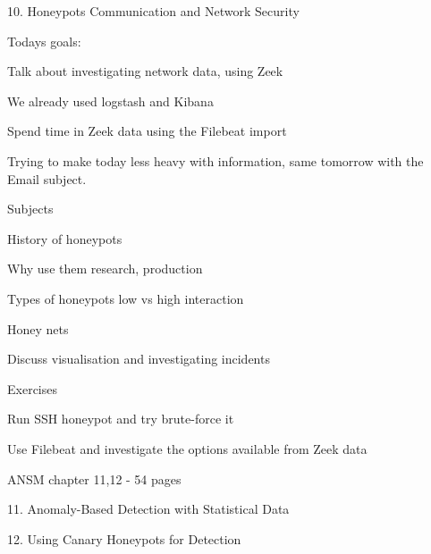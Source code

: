 \documentclass[Screen16to9,17pt]{foils}
\begin{document}
\mytitlepage
{10. Honeypots}
{Communication and Network Security \the\year}





Todays goals:
\begin{list2}
\item Talk about investigating network data, using Zeek
\item We already used logstash and Kibana
\item Spend time in Zeek data using the Filebeat import
\end{list2}

Trying to make today less heavy with information, same tomorrow with the Email subject.




\begin{list1}
\item Subjects
\begin{list2}
\item History of honeypots
\item Why use them research, production
\item Types of honeypots low vs high interaction
\item Honey nets
\item Discuss visualisation and investigating incidents
\end{list2}
\item Exercises
\begin{list2}
\item Run SSH honeypot and try brute-force it
\item Use Filebeat and investigate the options available from Zeek data
\end{list2}
\end{list1}



\begin{list1}
\item ANSM chapter 11,12 - 54 pages
\item 11. Anomaly-Based Detection
with Statistical Data
\item 12. Using Canary Honeypots
for Detection
\end{list1}


\end{document}

